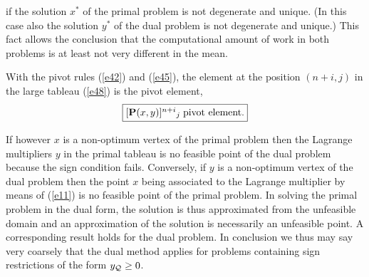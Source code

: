 %
if the solution $x^*$ of the primal problem is not degenerate and unique.  (In
this case also the solution $y^*$ of the dual problem is not degenerate and
unique.) This fact allows the conclusion that the computational amount of work
in both problems is at least not very different in the mean.
\par
With the pivot rules (\ref{e42}) and (\ref{e45}), the element at the position
$(n+i,j)$ in the large tableau (\ref{e48}) is the pivot element,
\[
\fbox{$
[{\bf P}(x,y)]^{n+i}{}_j \; \mbox{pivot element}.
$}
\]
\par
If however $x$ is a non-optimum vertex of the primal problem then the {\sc
Lagrange} multipliers $y$ in the primal tableau is no feasible point of
the dual problem because the sign condition fails.  Conversely, if
$y$ is a non-optimum vertex of the dual problem then the point $x$ being
associated to the {\sc Lagrange} multiplier by means of (\ref{e11}) is no
feasible point of the primal problem.  In solving the primal problem in the
dual form, the solution is thus approximated from the unfeasible domain and an
approximation of the solution is necessarily an unfeasible point.  A
corresponding result holds for the dual problem.  In conclusion we thus may say
very coarsely that the dual method applies for problems containing sign
restrictions of the form $y_{{\cal Q}} \geq 0$.
